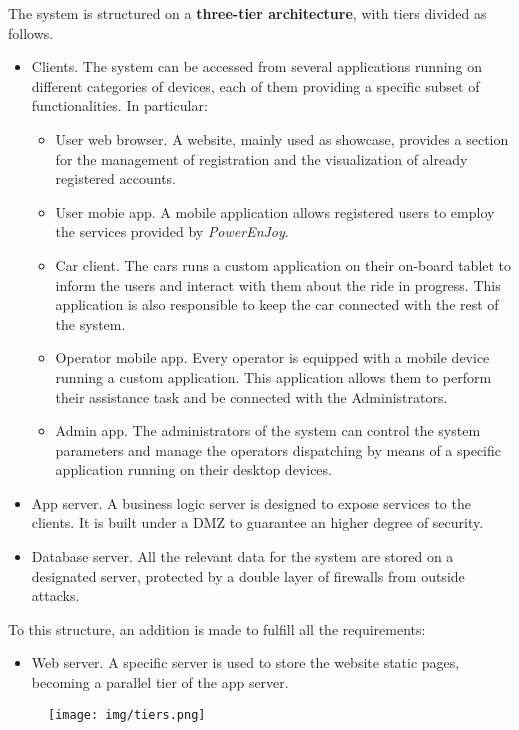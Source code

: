 The system is structured on a \textbf{three-tier architecture}, with tiers divided as follows.
\begin{itemize}
	\item{Clients.} The system can be accessed from several applications running on different categories of devices, each of them providing a specific subset of functionalities. In particular:
	\begin{itemize}
		\item{User web browser.} A website, mainly used as showcase, provides a section for the management of registration and the visualization of already registered accounts.
		\item{User mobie app.} A mobile application allows registered users to employ the services provided by \textit{PowerEnJoy}.
		\item{Car client.} The cars runs a custom application on their on-board tablet to inform the users and interact with them about the ride in progress. This application is also responsible to keep the car connected with the rest of the system.
		\item{Operator mobile app.} Every operator is equipped with a mobile device running a custom application. This application allows them to perform their assistance task and be connected with the Administrators.
		\item{Admin app.} The administrators of the system can control the system parameters and manage the operators dispatching by means of a specific application running on their desktop devices.
	\end{itemize}
	\item{App server.} A business logic server is designed to expose services to the clients. It is built under a DMZ to guarantee an higher degree of security.
	\item{Database server.} All the relevant data for the system are stored on a designated server, protected by a double layer of firewalls from outside attacks.
\end{itemize}
To this structure, an addition is made to fulfill all the requirements:
	\begin{itemize}
		\item{Web server.} A specific server is used to store the website static pages, becoming a parallel tier of the app server.
	\end{itemize}

\begin{figure}[h]
	\texttt{[image: img/tiers.png]} %
\end{figure}

